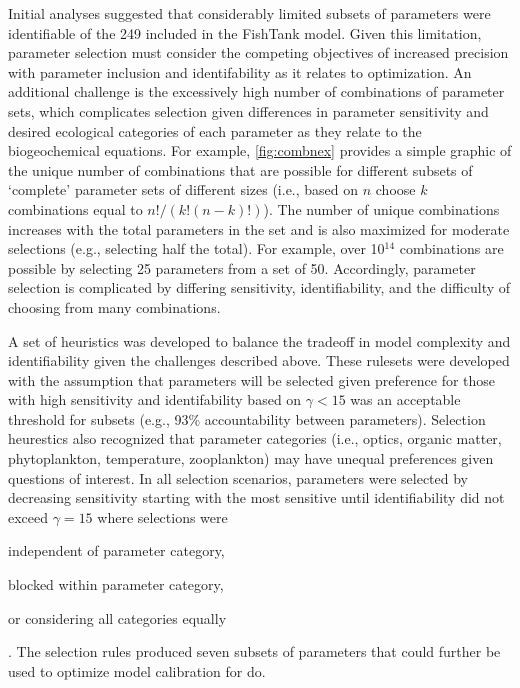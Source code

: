 \documentclass[letterpaper,12pt,oneside]{article}\usepackage[]{graphicx}\usepackage[]{color}
\begin{document}
Initial analyses suggested that considerably limited subsets of parameters were identifiable of the 249 included in the FishTank model.  Given this limitation, parameter selection must consider the competing objectives of increased precision with parameter inclusion and identifability as it relates to optimization.  An additional challenge is the excessively high number of combinations of parameter sets, which complicates selection given differences in parameter sensitivity and desired ecological categories of each parameter as they relate to the biogeochemical equations.  For example, \cref{fig:combnex} provides a simple graphic of the unique number of combinations that are possible for different subsets of `complete' parameter sets of different sizes (i.e., based on $n$ choose $k$ combinations equal to $n!/\left(k!\left(n-k\right)!\right)$).  The number of unique combinations increases with the total parameters in the set and is also maximized for moderate selections (e.g., selecting half the total).  For example, over 10$^14$ combinations are possible by selecting 25 parameters from a set of 50.  Accordingly, parameter selection is complicated by differing sensitivity, identifiability, and the difficulty of choosing from many combinations.

A set of heuristics was developed to balance the tradeoff in model complexity and identifiability given the challenges described above.  These rulesets were developed with the assumption that parameters will be selected given preference for those with high sensitivity and identifability based on $\gamma < 15$ was an acceptable threshold for subsets (e.g., 93\% accountability between parameters).  Selection heurestics also recognized that parameter categories (i.e., optics, organic matter, phytoplankton, temperature, zooplankton) may have unequal preferences given questions of interest.  In all selection scenarios, parameters were selected by decreasing sensitivity starting with the most sensitive until identifiability did not exceed $\gamma = 15$ where selections were \begin{inparaenum}[1\upshape)]
\item independent of parameter category,
\item blocked within parameter category,
\item or considering all categories equally
\end{inparaenum}.  The selection rules produced seven subsets of parameters that could further be used to optimize model calibration for \ac{do}.
\end{document}

